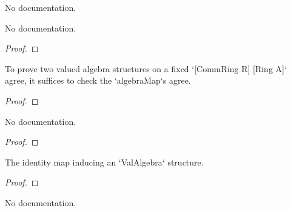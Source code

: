 \begin{definition}
\begin{definition}\label{ValRingHom.toValAlgebra}
        \leanok
                No documentation.
    \end{definition}

\begin{theorem}\label{ValRingHom.valAlgebraMap_toValAlgebra}
        \leanok
                No documentation.
    \end{theorem}

\begin{proof}
    \leanok
\end{proof}

\begin{theorem}\label{ValAlgebra.valAlgebra_ext}
        \leanok
                To prove two valued algebra structures on a fixed `[CommRing R] [Ring A]` agree,
it suffices to check the `algebraMap`s agree.
    \end{theorem}

\begin{proof}
    \leanok
\end{proof}

\begin{theorem}\label{ValAlgebra.val_isEquiv_comap}
        \leanok
                No documentation.
    \end{theorem}

\begin{proof}
    \leanok
\end{proof}

\begin{theorem}\label{ValAlgebra.id.map_eq_id}
        \leanok
                The identity map inducing an `ValAlgebra` structure.
    \end{theorem}

\begin{proof}
    \leanok
\end{proof}

\begin{theorem}\label{ValAlgebra.id.map_eq_self}
        \leanok
                No documentation.
    \end{theorem}


\end{definition}
